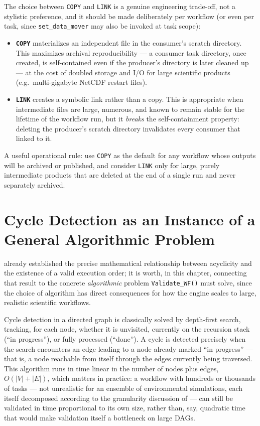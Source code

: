 The choice between \texttt{COPY} and \texttt{LINK} is a genuine engineering
trade-off, not a stylistic preference, and it should be made deliberately per
workflow (or even per task, since \texttt{set\_data\_mover} may also be
invoked at task scope):

\begin{itemize}[leftmargin=1.4em]
  \item \textbf{\texttt{COPY}} materializes an independent file in the
    consumer's scratch directory. This maximizes archival reproducibility ---
    a consumer task directory, once created, is self-contained even if the
    producer's directory is later cleaned up --- at the cost of doubled
    storage and I/O for large scientific products (e.g.\ multi-gigabyte
    NetCDF restart files).
  \item \textbf{\texttt{LINK}} creates a symbolic link rather than a copy.
    This is appropriate when intermediate files are large, numerous, and
    known to remain stable for the lifetime of the workflow run, but it
    \emph{breaks} the self-containment property: deleting the producer's
    scratch directory invalidates every consumer that linked to it.
\end{itemize}

\begin{practicebox}
A useful operational rule: use \texttt{COPY} as the default for any
workflow whose outputs will be archived or published, and consider
\texttt{LINK} only for large, purely intermediate products that are deleted
at the end of a single run and never separately archived.
\end{practicebox}

\section{Cycle Detection as an Instance of a General Algorithmic Problem}

 already established the precise mathematical
relationship between acyclicity and the existence of a valid execution
order; it is worth, in this chapter, connecting that result to the concrete
\emph{algorithmic} problem \texttt{Validate\_WF()} must solve, since the
choice of algorithm has direct consequences for how the engine scales to
large, realistic scientific workflows.

Cycle detection in a directed graph is classically solved by depth-first
search, tracking, for each node, whether it is unvisited, currently on the
recursion stack (``in progress''), or fully processed (``done''). A cycle is
detected precisely when the search encounters an edge leading to a node
already marked ``in progress'' --- that is, a node reachable from itself
through the edges currently being traversed. This algorithm runs in time
linear in the number of nodes plus edges, $O(|V| + |E|)$, which matters in
practice: a workflow with hundreds or thousands of tasks --- not unrealistic
for an ensemble of environmental simulations, each itself decomposed
according to the granularity discussion of  ---
can still be validated in time proportional to its own size, rather than,
say, quadratic time that would make validation itself a bottleneck on large
DAGs.

